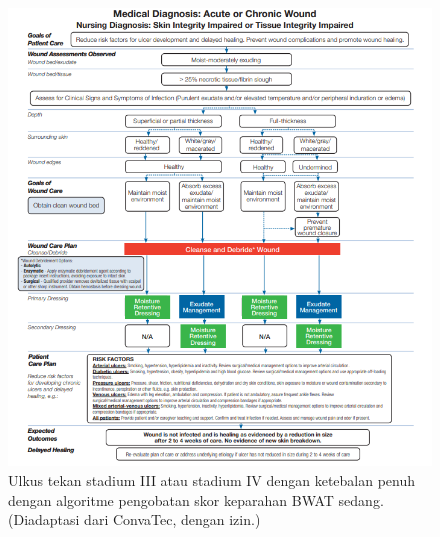 \begin{figure}[H]
	\centering
	\includegraphics[keepaspectratio, width=14cm]{gambar/gambar_25}
	\caption{Ulkus tekan stadium III atau stadium IV dengan ketebalan penuh dengan algoritme pengobatan skor keparahan BWAT sedang. (Diadaptasi dari ConvaTec, dengan izin.) \citep{sussman2012}}
	\label{gambar:gambar_25}
\end{figure}

